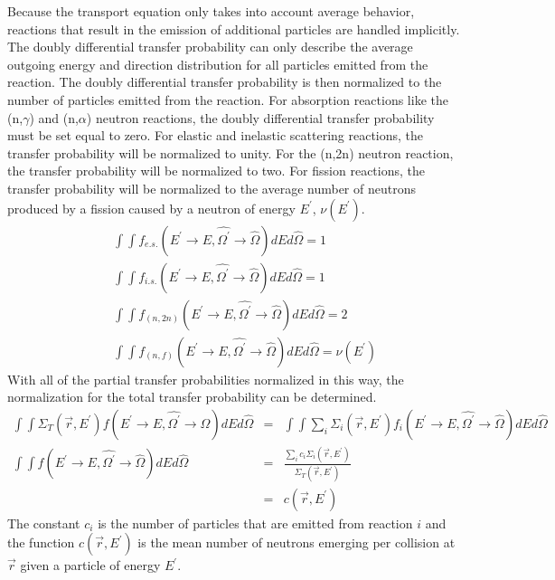 Because the transport equation only takes into account average behavior, 
reactions that result in the emission of additional particles are handled 
implicitly. The doubly differential transfer probability can only describe the
average outgoing energy and direction distribution for all particles emitted
from the reaction. The doubly differential transfer probability is then 
normalized to the number of particles emitted from the reaction. For absorption
reactions like the (n,$\gamma$) and (n,$\alpha$) neutron reactions, the 
doubly differential transfer probability must be set equal to zero. For 
elastic and inelastic scattering reactions, the transfer probability will be
normalized to unity. For the (n,2n) neutron reaction, the transfer probability
will be normalized to two. For fission reactions, the transfer probability
will be normalized to the average number of neutrons produced by a fission
caused by a neutron of energy $E^{'}$, $\nu(E^{'})$.
\begin{eqnarray}
  &&\int\int f_{e.s.}(E^{'} \to E,\hat{\Omega^{'}} \to \hat{\Omega})dEd\hat{\Omega}
  = 1 \nonumber \\
  &&\int\int f_{i.s.}(E^{'} \to E,\hat{\Omega^{'}} \to \hat{\Omega})dEd\hat{\Omega}
  = 1 \nonumber \\
  &&\int\int f_{(n,2n)}(E^{'} \to E,\hat{\Omega^{'}} \to \hat{\Omega})dEd\hat{\Omega}
  = 2 \nonumber \\
  &&\int\int f_{(n,f)}(E^{'} \to E,\hat{\Omega^{'}} \to \hat{\Omega})dEd\hat{\Omega}
  = \nu(E^{'}) \nonumber
\end{eqnarray}
With all of the partial transfer probabilities normalized in this way, the 
normalization for the total transfer probability can be determined.
\begin{eqnarray}
  \int\int   \Sigma_T(\vec{r},E^{'})
  f(E^{'} \to E,\hat{\Omega^{'}} \to \hat{\Omega}) dEd\hat{\Omega} \nonumber
  & = & \int\int \sum_i \Sigma_i(\vec{r},E^{'})
  f_i(E^{'} \to E,\hat{\Omega^{'}} \to \hat{\Omega}) dEd\hat{\Omega} \nonumber \\
  \int\int f(E^{'} \to E,\hat{\Omega^{'}} \to \hat{\Omega}) dEd\hat{\Omega} 
  & = & \frac{\sum_i c_i\Sigma_i(\vec{r},E^{'})}{\Sigma_T(\vec{r},E^{'})} 
  \nonumber \\
  & = & c(\vec{r},E^{'}) 
\end{eqnarray}
The constant $c_i$ is the number of particles that are emitted from reaction
$i$ and the function $c(\vec{r},E^{'})$ is the mean number of neutrons emerging
per collision at $\vec{r}$ given a particle of energy $E^{'}$.
  
